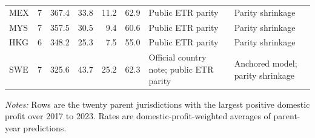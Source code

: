 \begin{table}[H]
\begin{adjustbox}{max width=\textwidth,center}
\begin{tabular}{@{}lrrrrrL{3.0cm}L{2.7cm}@{}}
MEX & 7 &    367.4 & 33.8 & 11.2 & 62.9 & Public ETR parity & Parity shrinkage \\
MYS & 7 &    357.5 & 30.5 &  9.4 & 60.6 & Public ETR parity & Parity shrinkage \\
HKG & 6 &    348.2 & 25.3 &  7.5 & 55.0 & Public ETR parity & Parity shrinkage \\
SWE & 7 &    325.6 & 43.7 & 25.2 & 62.3 & Official country note; public ETR parity & Anchored model; parity shrinkage \\
\bottomrule
\end{tabular}
\end{adjustbox}

\vspace{0.35em}
\noindent\begin{minipage}{\textwidth}
\footnotesize\raggedright\textit{Notes:} Rows are the twenty parent jurisdictions with the largest positive domestic profit over 2017 to 2023. Rates are domestic-profit-weighted averages of parent-year predictions.
\end{minipage}
\end{table}

